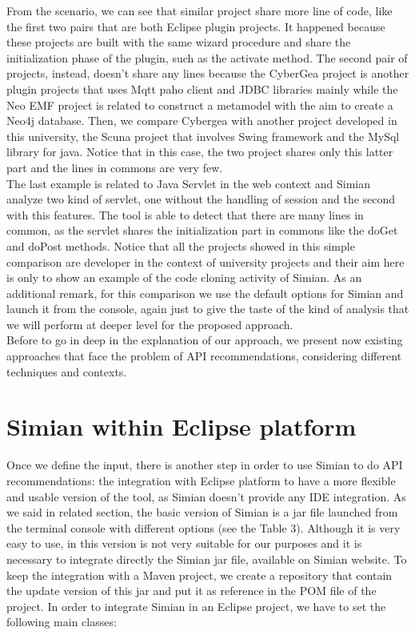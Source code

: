 From the scenario, we can see that similar project share more line of code, 
like the first two pairs that are both Eclipse plugin projects. It happened 
because these projects are built with the same wizard procedure and share the 
initialization phase of the plugin, such as the activate method. The second 
pair of projects, instead, doesn't share any lines because the CyberGea project 
is another plugin projects that uses Mqtt paho client and JDBC libraries mainly 
while the Neo EMF project is related to construct a metamodel with the aim to 
create a Neo4j database. Then, we compare Cybergea with another project 
developed in this university, the Scuna project that involves Swing framework 
and the MySql library for java. Notice that in this case, the two project 
shares only this latter part and the lines in commons are very few. \\
The last example is related to Java Servlet in the web context and Simian 
analyze two kind of servlet, one without the handling of session and the second 
with this features. The tool is able to detect that there are many lines in 
common, as the servlet shares the initialization part in commons like the doGet 
and doPost methods. Notice that all the projects showed in this simple 
comparison are developer in the context of university projects and their aim 
here is only to show an example of the code cloning activity of Simian. As an 
additional remark, for this comparison we use the default options for Simian 
and launch it from the console, again just to give the taste of the kind of 
analysis that we will perform at deeper level for the proposed approach. \\ 
Before to go in deep in the explanation of our approach, we present now 
existing approaches that face the problem of API recommendations, considering 
different techniques and contexts.





\section{Simian within Eclipse platform}
Once we define the input, there is another step in order to use Simian to do API recommendations: the integration with Eclipse platform to have a more flexible and usable version of the tool, as Simian doesn't provide any IDE integration. As we said in related section, the basic version of Simian is a jar file launched from the terminal console with different options (see the Table 3). Although it is very easy to use, in this version is not very suitable for our purposes and it is necessary to integrate directly the Simian jar file, available on Simian website. To keep the integration with a Maven project, we create a repository that contain the update version of this jar and put it as reference in the POM file of the project. 
In order to integrate Simian in an Eclipse project, we have to set the following main classes: 

